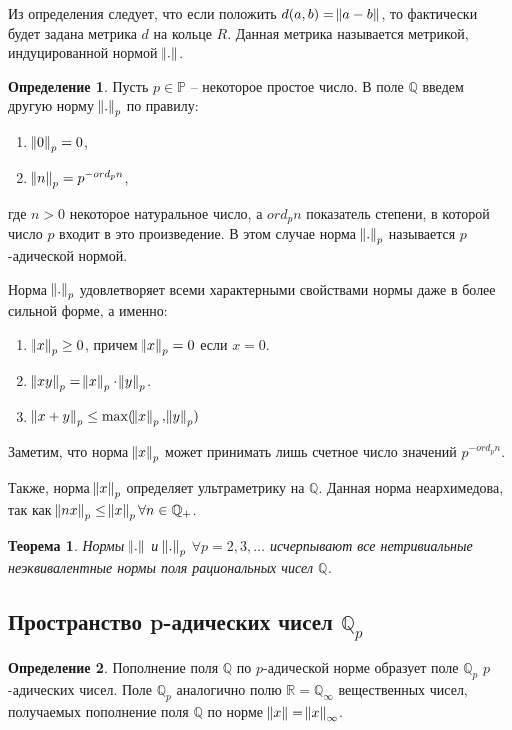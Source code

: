 \documentclass[master, och, diploma, times]{sty/SCWorks}
\theoremstyle{plain}
\newtheorem{thethm}{Теорема}
\theoremstyle{definition}
\newtheorem{defn}{Определение}[section]
\begin{document}
Из определения следует, что если положить $d(a, b)= \norm{a - b}$, то фактически будет задана метрика $d$ на кольце $R$. Данная метрика называется метрикой, индуцированной нормой $\norm{.}$.

\begin{defn}
Пусть $p \in \mathbb {P}$ -- некоторое простое число. В поле $\mathbb {Q}$ введем другую норму $\norm{.}_p$ по правилу:

\begin{enumerate} 
	\item $\norm{0}_p = 0$,
	\item $\norm{n}_p = p ^ {-ord_pn}$,
\end{enumerate}

\noindent где $n > 0$ некоторое натуральное число, а $ord_pn$ показатель степени, в которой число $p$ входит в это произведение. В этом случае норма $\norm{.}_p$ называется $p$-адической нормой.
\end{defn}

Норма $\norm{.}_p$  удовлетворяет всеми характерными свойствами нормы даже в более сильной форме, а именно:

\begin{enumerate} 
	\item $\norm{x}_p \ge 0$, причем $\norm{x}_p = 0$ если $x = 0$.
	\item $\norm{xy}_p = \norm{x}_p \cdot \norm{y}_p$.
	\item $\norm{x + y}_p \le \max(\norm{x}_p, \norm{y}_p)$ \cite{bib:analysis:volovich}
\end{enumerate}

Заметим, что норма $\norm{x}_p$ может принимать лишь счетное число значений $p ^ {-ord_pn}$.

Также, норма $\norm{x}_p$ определяет ультраметрику на $\mathbb {Q}$. Данная норма неархимедова, так как $\norm{nx}_p \le \norm{x}_p \forall n \in \mathbb {Q}_{+}$.

\begin{thethm}
	Нормы $\norm{.}$ и $\norm{.}_p$ $\forall p = 2, 3, \dots$ исчерпывают все нетривиальные неэквивалентные нормы поля рациональных чисел $\mathbb {Q}$.
\end{thethm}


\subsection{Пространство p-адических чисел $\mathbb {Q}_p$}

\begin{defn}
Пополнение поля $\mathbb {Q}$ по $p$-адической норме образует поле $\mathbb {Q}_p$ $p$-адических чисел. Поле $\mathbb {Q}_p$ аналогично полю $\mathbb {R} = \mathbb {Q}_{\infty}$ вещественных чисел, получаемых пополнение поля $\mathbb {Q}$ по норме $\norm{x}=\norm{x}_{\infty}$.
\end{defn}
\end{document}
